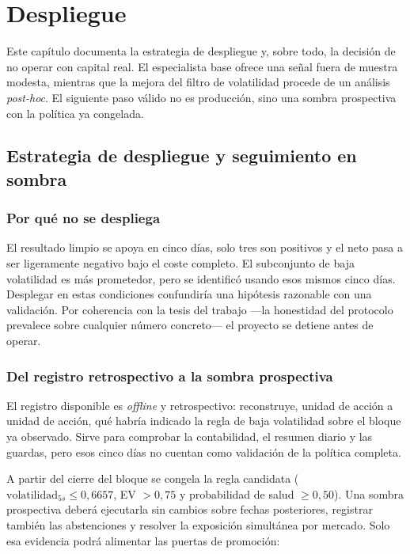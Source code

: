 %
\chapter{Despliegue}
\label{ch::despliegue}

Este capítulo documenta la estrategia de despliegue y, sobre todo, la decisión de no operar
con capital real. El especialista base ofrece una señal fuera de muestra modesta, mientras
que la mejora del filtro de volatilidad procede de un análisis \emph{post-hoc}. El siguiente
paso válido no es producción, sino una sombra prospectiva con la política ya congelada.

\section{Estrategia de despliegue y seguimiento en sombra}

\subsection{Por qué no se despliega}

El resultado limpio se apoya en cinco días, solo tres son positivos y el neto pasa a ser
ligeramente negativo bajo el coste completo. El subconjunto de baja volatilidad es más
prometedor, pero se identificó usando esos mismos cinco días. Desplegar en estas condiciones
confundiría una hipótesis razonable con una validación. Por coherencia con la tesis del
trabajo ---la honestidad del protocolo prevalece sobre cualquier número concreto--- el
proyecto se detiene antes de operar.

\subsection{Del registro retrospectivo a la sombra prospectiva}

El registro disponible es \emph{offline} y retrospectivo: reconstruye, unidad de acción a
unidad de acción, qué habría indicado la regla de baja volatilidad sobre el bloque ya
observado. Sirve para comprobar la contabilidad, el resumen diario y las guardas, pero esos
cinco días no cuentan como validación de la política completa.

A partir del cierre del bloque se congela la regla candidata
($\text{volatilidad}_{5s}\leq0{,}6657$, EV $>0{,}75$ y probabilidad de salud
$\geq0{,}50$). Una sombra prospectiva deberá ejecutarla sin cambios sobre fechas posteriores,
registrar también las abstenciones y resolver la exposición simultánea por mercado. Solo esa
evidencia podrá alimentar las puertas de promoción:

